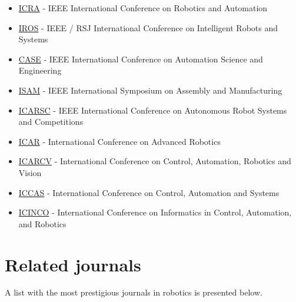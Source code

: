 \begin{itemize}[leftmargin=2em]
	\item \href{http://www.ieee-ras.org/conferences-workshops/fully-sponsored/icra}{ICRA} - IEEE International Conference on Robotics and Automation
	\item \href{http://www.ieee-ras.org/conferences-workshops/financially-co-sponsored/iros}{IROS} - IEEE / RSJ International Conference on Intelligent Robots and Systems
	\item \href{http://www.ieee-ras.org/conferences-workshops/fully-sponsored/case}{CASE} - IEEE International Conference on Automation Science and Engineering
	\item \href{http://www.ieee-ras.org/conferences-workshops/fully-sponsored/isam}{ISAM} - IEEE International Symposium on Assembly and Manufacturing
	\item \href{http://www.ieee-ras.org/conferences-workshops/technically-co-sponsored/robotica}{ICARSC} - IEEE International Conference on Autonomous Robot Systems and Competitions
	\item \href{http://www.ieee-ras.org/conferences-workshops/technically-co-sponsored/icar}{ICAR} - International Conference on Advanced Robotics
	\item \href{http://www.ieee-ras.org/conferences-workshops/technically-co-sponsored/icarcv}{ICARCV} - International Conference on Control, Automation, Robotics and Vision 
	\item \href{http://www.ieee-ras.org/conferences-workshops/technically-co-sponsored/iccas}{ICCAS} - International Conference on Control, Automation and Systems
	\item \href{http://www.ieee-ras.org/conferences-workshops/technically-co-sponsored/icinco}{ICINCO} - International Conference on Informatics in Control, Automation, and Robotics
\end{itemize}



\section{Related journals}

A list with the most prestigious journals in robotics is presented below.

